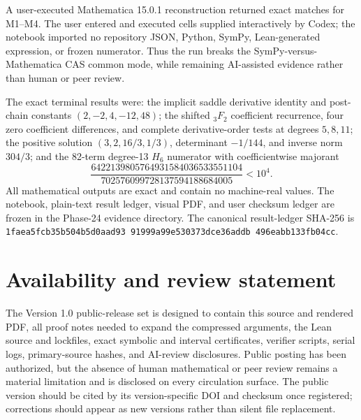 \documentclass[11pt]{article}
\theoremstyle{definition}
\theoremstyle{remark}
\begin{document}
A user-executed Mathematica 15.0.1 reconstruction returned exact matches for
M1--M4.  The user entered and executed cells supplied interactively by Codex;
the notebook imported no repository JSON, Python, SymPy, Lean-generated
expression, or frozen numerator.  Thus the run breaks the
SymPy-versus-Mathematica CAS common mode, while remaining AI-assisted evidence
rather than human or peer review.

The exact terminal results were: the implicit saddle derivative identity and
post-chain constants $(2,-2,4,-12,48)$; the shifted ${}_3F_2$ coefficient
recurrence, four zero coefficient differences, and complete derivative-order
tests at degrees $5,8,11$; the positive solution
$(3,2,16/3,1/3)$, determinant $-1/144$, and inverse norm $304/3$; and the
82-term degree-13 $H_6$ numerator with coefficientwise majorant
\[
 \frac{6422139805764931584036533551104}
 {702576099728137594188684005}<10^4.
\]
All mathematical outputs are exact and contain no machine-real values.  The
notebook, plain-text result ledger, visual PDF, and user checksum ledger are
frozen in the Phase-24 evidence directory.  The canonical result-ledger
SHA-256 is
\texttt{1faea5fc\allowbreak b35b504b\allowbreak 5d0aad93\allowbreak
91999a99\allowbreak e530373d\allowbreak ce36addb\allowbreak
496eabb1\allowbreak 33fb04cc}.

\section{Availability and review statement}

The Version 1.0 public-release set is designed to contain this source and rendered PDF,
all proof notes needed to expand the compressed arguments, the Lean source
and lockfiles, exact symbolic and interval certificates, verifier scripts,
serial logs, primary-source hashes, and AI-review disclosures.  Public
posting has been authorized, but the absence of human mathematical or peer
review remains a material limitation and is disclosed on every circulation
surface.  The public version should be cited by its version-specific DOI and
checksum once registered; corrections should appear as new versions rather
than silent file replacement.
\end{document}
